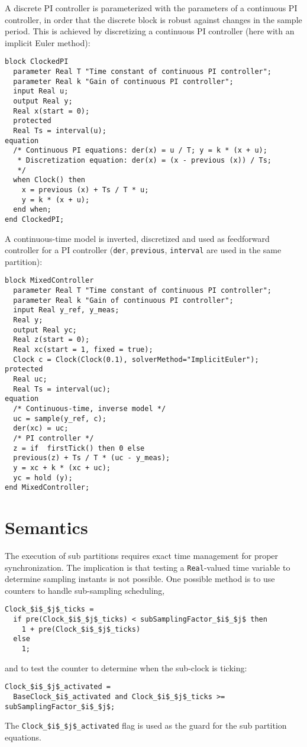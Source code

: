 \begin{example}
A discrete PI controller is parameterized with the parameters of a continuous PI controller, in order that the discrete block is robust against changes in the sample
period.  This is achieved by discretizing a continuous PI controller (here with an implicit Euler method):
\begin{lstlisting}[language=modelica]
block ClockedPI
  parameter Real T "Time constant of continuous PI controller";
  parameter Real k "Gain of continuous PI controller";
  input Real u;
  output Real y;
  Real x(start = 0);
  protected
  Real Ts = interval(u);
equation
  /* Continuous PI equations: der(x) = u / T; y = k * (x + u);
   * Discretization equation: der(x) = (x - previous (x)) / Ts;
   */
  when Clock() then
    x = previous (x) + Ts / T * u;
    y = k * (x + u);
  end when;
end ClockedPI;
\end{lstlisting}
A continuous-time model is inverted, discretized and used as feedforward controller for a PI controller (\lstinline!der!, \lstinline!previous!, \lstinline!interval! are used in the same partition):
\begin{lstlisting}[language=modelica]
block MixedController
  parameter Real T "Time constant of continuous PI controller";
  parameter Real k "Gain of continuous PI controller";
  input Real y_ref, y_meas;
  Real y;
  output Real yc;
  Real z(start = 0);
  Real xc(start = 1, fixed = true);
  Clock c = Clock(Clock(0.1), solverMethod="ImplicitEuler");
protected
  Real uc;
  Real Ts = interval(uc);
equation
  /* Continuous-time, inverse model */
  uc = sample(y_ref, c);
  der(xc) = uc;
  /* PI controller */
  z = if  firstTick() then 0 else
  previous(z) + Ts / T * (uc - y_meas);
  y = xc + k * (xc + uc);
  yc = hold (y);
end MixedController;
\end{lstlisting}
\end{example}

\section{Semantics}\label{semantics}

The execution of sub partitions requires exact time management for proper synchronization.
The implication is that testing a \lstinline!Real!-valued time variable to determine sampling instants is not possible.
One possible method is to use counters to handle sub-sampling scheduling,
\begin{lstlisting}[language=modelica]
Clock_$i$_$j$_ticks =
  if pre(Clock_$i$_$j$_ticks) < subSamplingFactor_$i$_$j$ then
    1 + pre(Clock_$i$_$j$_ticks)
  else
    1;
\end{lstlisting}
and to test the counter to determine when the sub-clock is ticking:
\begin{lstlisting}[language=modelica]
Clock_$i$_$j$_activated =
  BaseClock_$i$_activated and Clock_$i$_$j$_ticks >= subSamplingFactor_$i$_$j$;
\end{lstlisting}
The \lstinline!Clock_$i$_$j$_activated! flag is used as the guard for the sub
partition equations.

